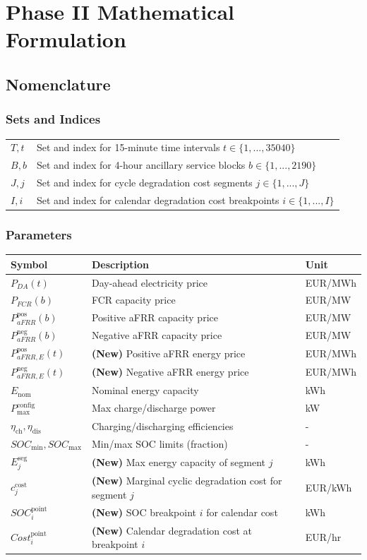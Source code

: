 \documentclass[11pt, a4paper]{article}
\begin{document}
\section{Phase II Mathematical Formulation}

\subsection{Nomenclature}
\subsubsection{Sets and Indices}
\begin{tabular}{@{}ll}
\toprule
$T, t$ & Set and index for 15-minute time intervals $t \in \{1, ..., 35040\}$ \\
$B, b$ & Set and index for 4-hour ancillary service blocks $b \in \{1, ..., 2190\}$ \\
$J, j$ & Set and index for cycle degradation cost segments $j \in \{1, ..., J\}$ \\
$I, i$ & Set and index for calendar degradation cost breakpoints $i \in \{1, ..., I\}$ \\
\bottomrule
\end{tabular}

\subsubsection{Parameters}
\begin{tabular}{@{}lll}
\toprule
Symbol & Description & Unit \\
\midrule
$P_{DA}(t)$ & Day-ahead electricity price & EUR/MWh \\
$P_{FCR}(b)$ & FCR capacity price & EUR/MW \\
$P^{\mathrm{pos}}_{aFRR}(b)$ & Positive aFRR capacity price & EUR/MW \\
$P^{\mathrm{neg}}_{aFRR}(b)$ & Negative aFRR capacity price & EUR/MW \\
$P^{\mathrm{pos}}_{aFRR,E}(t)$ & \textbf{(New)} Positive aFRR energy price & EUR/MWh \\
$P^{\mathrm{neg}}_{aFRR,E}(t)$ & \textbf{(New)} Negative aFRR energy price & EUR/MWh \\
$E_{\mathrm{nom}}$ & Nominal energy capacity & kWh \\
$P^{\mathrm{config}}_{\max}$ & Max charge/discharge power & kW \\
$\eta_{\mathrm{ch}}, \eta_{\mathrm{dis}}$ & Charging/discharging efficiencies & - \\
$SOC_{\min}, SOC_{\max}$ & Min/max SOC limits (fraction) & - \\
$E^{\mathrm{seg}}_{j}$ & \textbf{(New)} Max energy capacity of segment $j$ & kWh \\
$c^{\mathrm{cost}}_{j}$ & \textbf{(New)} Marginal cyclic degradation cost for segment $j$ & EUR/kWh \\
$SOC^{\mathrm{point}}_i$ & \textbf{(New)} SOC breakpoint $i$ for calendar cost & kWh \\
$Cost^{\mathrm{point}}_i$ & \textbf{(New)} Calendar degradation cost at breakpoint $i$ & EUR/hr \\
\bottomrule
\end{tabular}
\end{document}
